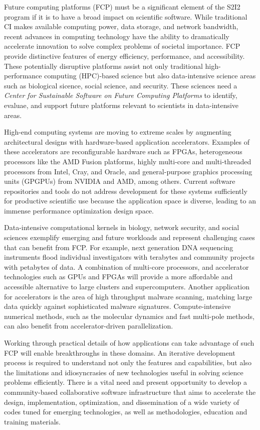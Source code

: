 Future computing platforms (FCP) must be a significant element of the S2I2 program if it is to have a broad impact on scientific software. 
While traditional CI makes available computing power, data storage, and network bandwidth, recent advances in computing technology have the ability to dramatically accelerate innovation to solve complex problems of societal importance. 
FCP provide distinctive features of energy efficiency, performance, and accessibility. 
These potentially disruptive platforms assist not only traditional high-performance computing (HPC)-based science but also data-intensive science areas such as biological sicence, 
social science, and security.  
These sciences need a \textit{Center for Sustainable Software on Future Computing Platforms} to identify, evaluae, and support future platforms relevant to scientists in data-intensive areas.

High-end computing systems are moving to extreme scales by augmenting architectural designs with hardware-based application accelerators. 
Examples of these accelerators are reconfigurable hardware such as FPGAs, heterogeneous processors like the AMD Fusion platforms, 
highly multi-core and multi-threaded processors from Intel, Cray, and Oracle, and general-purpose graphics processing units (GPGPUs) from NVIDIA and AMD, among others. 
Current software repositories and tools do not address development for these systems sufficiently for productive scientific use because the application space is diverse, 
leading to an immense performance optimization design space.

Data-intensive computational kernels in biology, network security, and social sciences exemplify emerging and future workloads and represent challenging cases that can benefit from FCP. 
For example, next generation DNA sequencing instruments flood individual investigators with terabytes and community projects with petabytes of data. 
A combination of multi-core processors, and accelerator technologies such as GPUs and FPGAs will provide a more affordable and accessible alternative to large clusters and supercomputers. 
Another application for accelerators is the area of high throughput malware scanning, matching large data quickly against sophisticated malware signatures. 
Compute-intensive numerical methods, such as the molecular dynamics and fast multi-pole methods, can also benefit from accelerator-driven parallelization.

Working through practical details of how applications can take advantage of such FCP will enable breakthroughs in these domains. 
An iterative development process is required to understand not only the features and capabilities, 
but also the limitations and idiosyncrasies of new technologies useful in solving science problems efficiently. 
There is a vital need and present opportunity to develop a community-based collaborative software infrastructure 
that aims to accelerate the design, implementation, optimization, and dissemination of a wide variety of codes tuned for emerging technologies, 
as well as methodologies, education and training materials.


